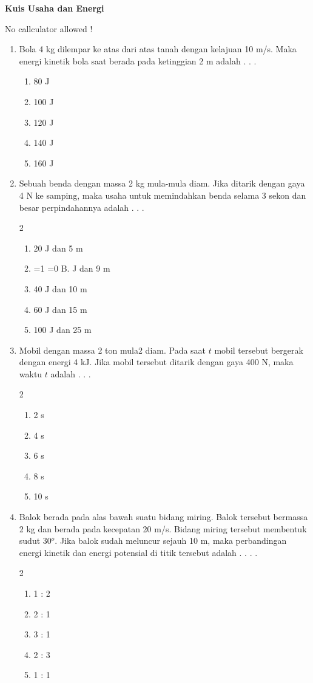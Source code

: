 \documentclass[11pt,a4paper]{article}
\def\tampilkunci{1}
\newcommand*\kunci[1]{\ifnum\tampilkunci=1
%
\tikz[baseline=(char.base)]{\node[red, shape=circle,draw,inner sep=0.5pt,xshift=2pt](char){#1};}\stepcounter{enumii}
\fi\ifnum\tampilkunci=0
%
\hspace{3pt}#1\stepcounter{enumii}
%
\fi}
\newcommand*\pilgan[1]{
\begin{enumerate}[label=\Alph*., itemsep=0pt,topsep=0pt,leftmargin=*,align=Center] #1 
\end{enumerate}}
\newcommand{\pilgani}[1]{                            \vspace{-0.3cm}\begin{multicols}{2}
 \begin{enumerate}[label=\Alph*., itemsep=0pt,topsep=0pt,leftmargin=*,align=Center]#1                     \end{enumerate}
 \phantom{ini cuma sapi, wedus, dan ayam}
 \end{multicols}}
\begin{document}
 \textbf{Kuis Usaha dan Energi} \phantom{ini nama siswa yang aaamengerjakan soal kuis ini }  

No callculator allowed !  

\begin{enumerate}

\item Bola 4 kg dilempar ke atas dari atas tanah dengan kelajuan 10 m/s. Maka energi kinetik bola saat berada pada ketinggian 2 m adalah . . . 
    \pilgan{
        \item 80 J
        \item 100 J
        \item 120 J
        \item 140 J
        \item 160 J } \vspace{2cm}
        
\item Sebuah benda dengan massa 2 kg mula-mula diam. Jika ditarik dengan gaya 4 N ke samping, maka usaha untuk memindahkan benda selama 3 sekon dan besar perpindahannya adalah . . . 
    \pilgani{
        \item 20 J dan 5 m
        \item \kunci{B.}36 J dan 9 m
        \item 40 J dan 10 m
        \item 60 J dan 15 m
        \item 100 J dan 25 m
    } \vspace{2cm}


\item Mobil dengan massa 2 ton mula2 diam. Pada saat $t$ mobil tersebut bergerak dengan energi 4 kJ. Jika mobil tersebut ditarik dengan gaya 400 N, maka waktu $t$ adalah . . . 
    \pilgani{
        \item 2 s
        \item 4 s
        \item 6 s
        \item 8 s
        \item 10 s
    }  \vspace{2cm}

\item Balok berada pada alas bawah suatu bidang miring. Balok tersebut bermassa 2 kg dan berada pada kecepatan 20 m/s. Bidang miring tersebut membentuk sudut 30$^o$. Jika balok sudah meluncur sejauh 10 m, maka perbandingan energi kinetik dan energi potensial di titik tersebut adalah . . . .
    \pilgani{
        \item 1 : 2
        \item 2 : 1
        \item 3 : 1 
        \item 2 : 3
        \item 1 : 1
    }  \vspace{2cm}


\end{enumerate}
\end{document}
